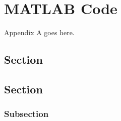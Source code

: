 


\chapter{MATLAB Code}
\label{AppendixA}

Appendix A goes here.



\section{Section}
\noindent \lipsum[1][3-5] %
\newline


\section{Section}
\noindent \lipsum[1][3-5] %
\newline

\subsection{Subsection}
\noindent \lipsum[1][3-5] %

